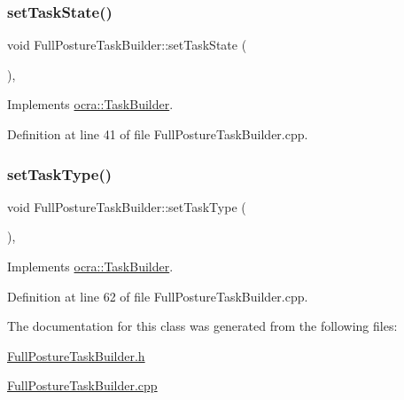 \subsubsection{\texorpdfstring{set\+Task\+State()}{setTaskState()}}
{\footnotesize\ttfamily void Full\+Posture\+Task\+Builder\+::set\+Task\+State (\begin{DoxyParamCaption}{ }\end{DoxyParamCaption})\hspace{0.3cm}{\ttfamily [protected]}, {\ttfamily [virtual]}}



Implements \hyperlink{classocra_1_1TaskBuilder_a7b44bfa101566ea4400e2d9bfdb9ff32}{ocra\+::\+Task\+Builder}.



Definition at line 41 of file Full\+Posture\+Task\+Builder.\+cpp.

\hypertarget{classocra_1_1FullPostureTaskBuilder_a5bae08175fd730b46004ddfccc9a1d8b}{}\label{classocra_1_1FullPostureTaskBuilder_a5bae08175fd730b46004ddfccc9a1d8b} 
\subsubsection{\texorpdfstring{set\+Task\+Type()}{setTaskType()}}
{\footnotesize\ttfamily void Full\+Posture\+Task\+Builder\+::set\+Task\+Type (\begin{DoxyParamCaption}{ }\end{DoxyParamCaption})\hspace{0.3cm}{\ttfamily [protected]}, {\ttfamily [virtual]}}



Implements \hyperlink{classocra_1_1TaskBuilder_a1a979fc495be6dc30483aa8fd0ff2650}{ocra\+::\+Task\+Builder}.



Definition at line 62 of file Full\+Posture\+Task\+Builder.\+cpp.



The documentation for this class was generated from the following files\+:\begin{DoxyCompactItemize}
\item 
\hyperlink{FullPostureTaskBuilder_8h}{Full\+Posture\+Task\+Builder.\+h}\item 
\hyperlink{FullPostureTaskBuilder_8cpp}{Full\+Posture\+Task\+Builder.\+cpp}\end{DoxyCompactItemize}
